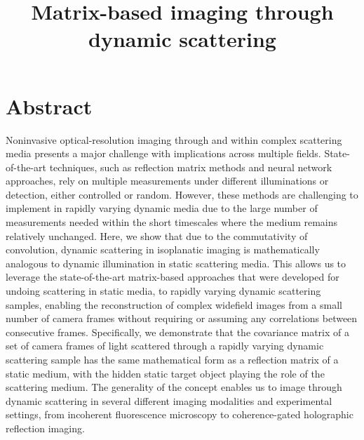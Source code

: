 \documentclass[pdflatex,sn-mathphys-num]{sn-jnl}%
\theoremstyle{thmstyleone}%
\theoremstyle{thmstyletwo}%
\theoremstyle{thmstylethree}%
\begin{document}
\title[Article Title]{Matrix-based imaging through dynamic scattering}

\author[1]{ }

\author[1]{ }

\author[1]{ }

\author*[1]{ }




\maketitle


\section*{Abstract} %

Noninvasive optical-resolution imaging through and within complex scattering media presents a major challenge with implications across multiple fields. 
State-of-the-art techniques, such as reflection matrix methods and neural network approaches, rely on multiple measurements under different illuminations or detection, either controlled or random. However, these methods are challenging to implement in rapidly varying dynamic media due to the large number of measurements needed within the short timescales where the medium remains relatively unchanged.
Here, we show that due to the commutativity of convolution, dynamic scattering in isoplanatic imaging is mathematically analogous to dynamic illumination in static scattering media. This allows us to leverage the state-of-the-art matrix-based approaches that were developed for undoing scattering in static media, to rapidly varying dynamic scattering samples, enabling the reconstruction of complex widefield images from a small number of camera frames without requiring or assuming any correlations between consecutive frames. Specifically, we demonstrate that the covariance matrix of a set of camera frames of light scattered through a rapidly varying dynamic scattering sample has the same mathematical form as a reflection matrix of a static medium, with the hidden static target object playing the role of the scattering medium.
The generality of the concept enables us to image through dynamic scattering in several different imaging modalities and experimental settings, from incoherent fluorescence microscopy to coherence-gated holographic reflection imaging.
 
\end{document}
